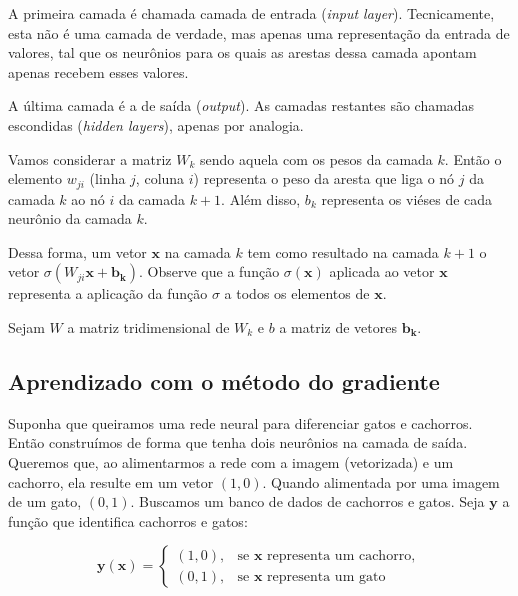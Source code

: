 \documentclass{article}
\begin{document}
            A primeira camada é chamada camada de entrada (\textit{input layer}).
            Tecnicamente, esta não é uma camada de verdade, mas apenas uma representação da entrada de valores, tal que os neurônios para os quais as arestas dessa camada apontam apenas recebem esses valores.
            
            A última camada é a de saída (\textit{output}).
            As camadas restantes são chamadas escondidas (\textit{hidden layers}), apenas por analogia.

            Vamos considerar a matriz $W_k$ sendo aquela com os pesos da camada $k$.
            Então o elemento $w_{ji}$ (linha $j$, coluna $i$) representa o peso da aresta que liga o nó $j$ da camada $k$ ao nó $i$ da camada $k + 1$.
            Além disso, $b_k$ representa os viéses de cada neurônio da camada $k$.
            
            Dessa forma, um vetor $\mathbf{x}$ na camada $k$ tem como resultado na camada $k + 1$ o vetor $\sigma (W_{ji} \mathbf{x} + \mathbf{b_k})$.
            Observe que a função $\sigma(\mathbf{x})$ aplicada ao vetor $\mathbf{x}$ representa a aplicação da função $\sigma$ a todos os elementos de $\mathbf{x}$.

            Sejam $W$ a matriz tridimensional de $W_k$ e $b$ a matriz de vetores $\mathbf{b_k}$.

        \subsection{Aprendizado com o método do gradiente}
        
            Suponha que queiramos uma rede neural para diferenciar gatos e cachorros.
            Então construímos de forma que tenha dois neurônios na camada de saída.
            Queremos que, ao alimentarmos a rede com a imagem (vetorizada) e um cachorro, ela resulte em um vetor $(1, 0)$.
            Quando alimentada por uma imagem de um gato, $(0, 1)$.
            Buscamos um banco de dados de cachorros e gatos. Seja $\mathbf{y}$ a função que identifica cachorros e gatos:

            \begin{equation}
                \mathbf{y}(\mathbf{x}) =    \begin{cases}
                                                (1, 0), & \textrm{se } \mathbf{x} \textrm{ representa um cachorro}, \\
                                                (0, 1), & \textrm{se } \mathbf{x} \textrm{ representa um gato}
                                            \end{cases}
            \end{equation}
\end{document}
